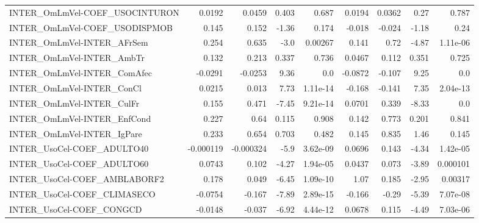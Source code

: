 \begin{tabular}{lrrrrrrrr}
INTER\_OmLmVel-COEF\_USOCINTURON        &      0.0192 &       0.0459 &    0.403 &    0.687 &     0.0194 &      0.0362 &         0.27 &         0.787 \\
INTER\_OmLmVel-COEF\_USODISPMOB         &       0.145 &        0.152 &    -1.36 &    0.174 &     -0.018 &      -0.024 &        -1.18 &          0.24 \\
INTER\_OmLmVel-INTER\_AFrSem            &       0.254 &        0.635 &     -3.0 &  0.00267 &      0.141 &        0.72 &        -4.87 &      1.11e-06 \\
INTER\_OmLmVel-INTER\_AmbTr             &       0.132 &        0.213 &    0.337 &    0.736 &     0.0467 &       0.112 &        0.351 &         0.725 \\
INTER\_OmLmVel-INTER\_ComAfec           &     -0.0291 &      -0.0253 &     9.36 &      0.0 &    -0.0872 &      -0.107 &         9.25 &           0.0 \\
INTER\_OmLmVel-INTER\_ConCl             &      0.0215 &        0.013 &     7.73 & 1.11e-14 &     -0.168 &      -0.141 &         7.35 &      2.04e-13 \\
INTER\_OmLmVel-INTER\_CulFr             &       0.155 &        0.471 &    -7.45 & 9.21e-14 &     0.0701 &       0.339 &        -8.33 &           0.0 \\
INTER\_OmLmVel-INTER\_EnfCond           &       0.227 &         0.64 &    0.115 &    0.908 &      0.142 &       0.773 &        0.201 &         0.841 \\
INTER\_OmLmVel-INTER\_IgPare            &       0.233 &        0.654 &    0.703 &    0.482 &      0.145 &       0.835 &         1.46 &         0.145 \\
INTER\_UsoCel-COEF\_ADULTO40            &   -0.000119 &    -0.000324 &     -5.9 & 3.62e-09 &     0.0696 &       0.143 &        -4.34 &      1.42e-05 \\
INTER\_UsoCel-COEF\_ADULTO60            &      0.0743 &        0.102 &    -4.27 & 1.94e-05 &     0.0437 &       0.073 &        -3.89 &      0.000101 \\
INTER\_UsoCel-COEF\_AMBLABORF2          &       0.178 &        0.049 &    -6.45 & 1.09e-10 &       1.07 &       0.185 &        -2.95 &       0.00317 \\
INTER\_UsoCel-COEF\_CLIMASECO           &     -0.0754 &       -0.167 &    -7.89 & 2.89e-15 &     -0.166 &       -0.29 &        -5.39 &      7.07e-08 \\
INTER\_UsoCel-COEF\_CONGCD              &     -0.0148 &       -0.037 &    -6.92 & 4.44e-12 &     0.0678 &       0.115 &        -4.49 &      7.03e-06 \\

\end{tabular}
